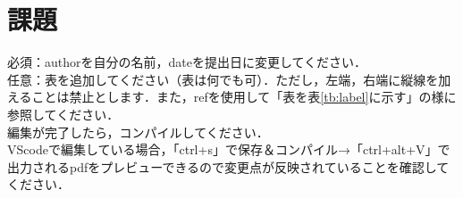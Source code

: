 \documentclass[a4paper,10pt]{jsarticle}
\begin{document}
\section{課題}
\noindent 必須：authorを自分の名前，dateを提出日に変更してください．\\
任意：表を追加してください（表は何でも可）．ただし，左端，右端に縦線を加えることは禁止とします．また，refを使用して「表を表\ref{tb:label}に示す」の様に参照してください．\\

\noindent 編集が完了したら，コンパイルしてください．\\
VScodeで編集している場合，「ctrl+s」で保存＆コンパイル→「ctrl+alt+V」で出力されるpdfをプレビューできるので変更点が反映されていることを確認してください．
\end{document}
